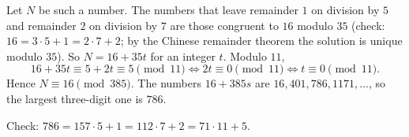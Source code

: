 Let $N$ be such a number. The numbers that leave remainder $1$ on division by $5$ and remainder $2$ on division by $7$ are those congruent to $16$ modulo $35$ (check: $16=3\cdot5+1=2\cdot7+2$; by the Chinese remainder theorem the solution is unique modulo $35$). So $N=16+35t$ for an integer $t$. Modulo $11$,
\[16+35t\equiv5+2t\equiv5\pmod{11}\iff 2t\equiv0\pmod{11}\iff t\equiv0\pmod{11}.\]
Hence $N\equiv16\pmod{385}$. The numbers $16+385s$ are $16, 401, 786, 1171,\dots$, so the largest three-digit one is $\boxed{786}$.

Check: $786=157\cdot5+1=112\cdot7+2=71\cdot11+5$.
